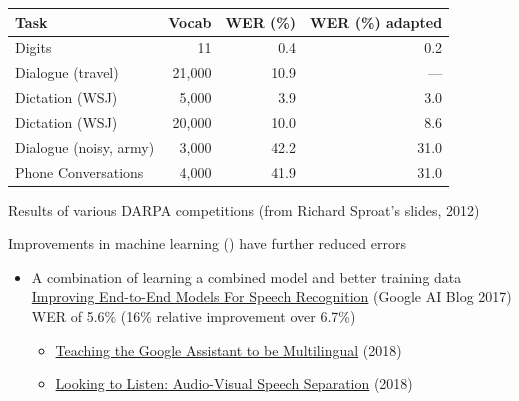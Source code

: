 \documentclass[a4paper,landscape,headrule,footrule,xetex]{foils}
\begin{document}

  \begin{tabular}{lrrr}
    Task & Vocab & WER (\%) & WER  (\%) adapted \\ \hline
    Digits & 11 & 0.4 & 0.2 \\
    Dialogue (travel) & 21,000 & 10.9 & --- \\
    Dictation (WSJ) & 5,000 & 3.9 & 3.0 \\
    Dictation (WSJ) & 20,000 & 10.0 & 8.6 \\
    Dialogue (noisy, army) & 3,000 & 42.2 & 31.0 \\
    Phone Conversations & 4,000 & 41.9 & 31.0 \\
  \end{tabular}

Results of various DARPA competitions (from Richard Sproat's slides, 2012)

Improvements in machine learning () have
further reduced errors

\begin{itemize}
\item A combination of learning a combined model and better training data
\\
\href{https://ai.googleblog.com/2017/12/improving-end-to-end-models-for-speech.html}{Improving
  End-to-End Models For Speech Recognition} (Google AI Blog 2017)
\\ WER of 5.6\% (16\% relative improvement over 6.7\%)
\begin{itemize}
\item
  \href{https://ai.googleblog.com/2018/08/Multilingual-Google-Assistant.html}{Teaching
    the Google Assistant to be Multilingual} (2018)
\item
  \href{https://ai.googleblog.com/2018/04/looking-to-listen-audio-visual-speech.html}{Looking
    to Listen: Audio-Visual Speech Separation} (2018)
\end{itemize}
\end{itemize}
\end{document}

